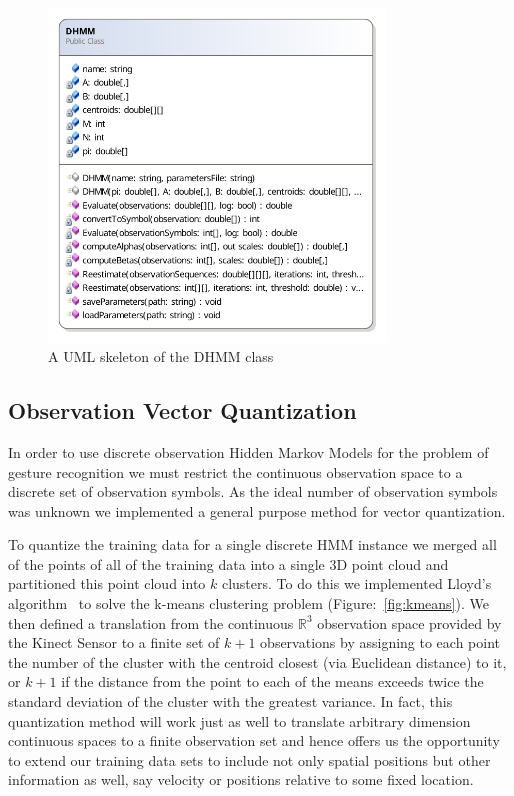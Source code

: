 \begin{figure}[h!]
        \centering
        \includegraphics[width=0.8\textwidth]{ThesisFigs/DHMMDiag}
        \caption{A UML skeleton of the DHMM class}\label{fig:dhmmdiag}
\end{figure}

\subsection{Observation Vector Quantization}
In order to use discrete observation Hidden Markov Models for the problem of gesture recognition we must restrict the continuous observation space to a discrete set of observation symbols. As the ideal number of observation symbols was unknown we implemented a general purpose method for vector quantization.

To quantize the training data for a single discrete HMM instance we merged all of the points of all of the training data into a single 3D point cloud and partitioned this point cloud into $k$ clusters. To do this we implemented Lloyd's algorithm~\citep{lloyd1982least} to solve the k-means clustering problem (Figure:~\ref{fig:kmeans}). We then defined a translation from the continuous $\mathbb{R}^3$ observation space provided by the Kinect Sensor to a finite set of $k+1$ observations by assigning to each point the number of the cluster with the centroid closest (via Euclidean distance) to it, or $k+1$ if the distance from the point to each of the means exceeds twice the standard deviation of the cluster with the greatest variance. In fact, this quantization method will work just as well to translate arbitrary dimension continuous spaces to a finite observation set and hence offers us the opportunity to extend our training data sets to include not only spatial positions but other information as well, say velocity or positions relative to some fixed location.

